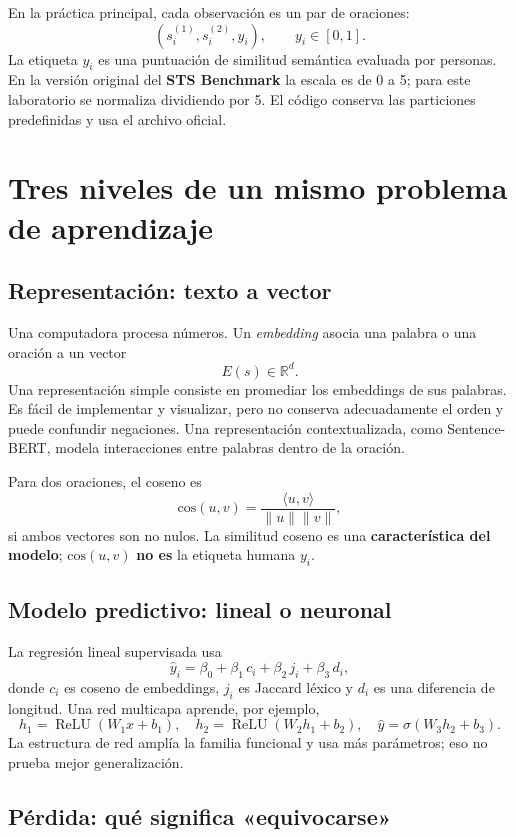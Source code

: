 \documentclass[11pt,a4paper]{article}
\newcommand{\R}{\mathbb R}
\begin{document}
En la práctica principal, cada observación es un par de oraciones:
\[
  (s_i^{(1)},s_i^{(2)},y_i),\qquad y_i\in[0,1].
\]
La etiqueta \(y_i\) es una puntuación de similitud semántica evaluada por personas. En la versión original del \textbf{STS Benchmark} la escala es de 0 a 5; para este laboratorio se normaliza dividiendo por 5. El código conserva las particiones predefinidas y usa el archivo oficial.

\section{Tres niveles de un mismo problema de aprendizaje}

\subsection{Representación: texto a vector}

Una computadora procesa números. Un \emph{embedding} asocia una palabra o una oración a un vector
\[
E(s)\in\R^d.
\]
Una representación simple consiste en promediar los embeddings de sus palabras. Es fácil de implementar y visualizar, pero no conserva adecuadamente el orden y puede confundir negaciones. Una representación contextualizada, como Sentence-BERT, modela interacciones entre palabras dentro de la oración.

Para dos oraciones, el coseno es
\[
  \mathrm{cos}(u,v)=\frac{\langle u,v\rangle}{\lVert u\rVert\lVert v\rVert},
\]
si ambos vectores son no nulos. La similitud coseno es una \textbf{característica del modelo}; \(\mathrm{cos}(u,v)\) \textbf{no es} la etiqueta humana \(y_i\).

\subsection{Modelo predictivo: lineal o neuronal}

La regresión lineal supervisada usa
\[
 \widehat y_i=\beta_0+\beta_1\,c_i+\beta_2\,j_i+\beta_3\,d_i,
\]
donde \(c_i\) es coseno de embeddings, \(j_i\) es Jaccard léxico y \(d_i\) es una diferencia de longitud. Una red multicapa aprende, por ejemplo,
\[
  h_1=\operatorname{ReLU}(W_1x+b_1),\quad
  h_2=\operatorname{ReLU}(W_2h_1+b_2),\quad
  \widehat y=\sigma(W_3h_2+b_3).
\]
La estructura de red amplía la familia funcional y usa más parámetros; eso no prueba mejor generalización.

\subsection{Pérdida: qué significa «equivocarse»}
\end{document}
